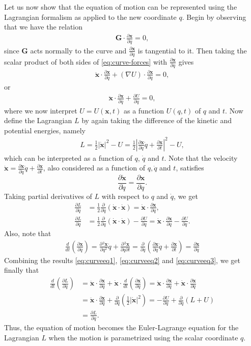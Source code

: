 \documentclass[12pt]{amsart}
\newcommand{\eq}[1]{\begin{equation}\begin{split}#1\end{split}\end{equation}}
\newcommand{\eqst}[1]{\begin{align*}#1\end{align*}}
\newcommand{\grad}{\nabla}
\newcommand{\der}[2]{\frac{d#1}{d#2}}
\newcommand{\pder}[2]{\frac{\partial#1}{\partial#2}}
\begin{document}
Let us now show that the equation of motion can be represented using the Lagrangian formalism as applied to the new coordinate $q$. Begin by observing that we have the relation
\eqst{ \mathbf{G}\cdot \pder{\mathbf{x}}{q} = 0, }
since $\mathbf{G}$ acts normally to the curve and $\pder{\mathbf{x}}{q}$ is tangential to it. Then taking the scalar product of both sides of \eqref{eq:curve-forces} with $\pder{\mathbf{x}}{q}$ gives
\eqst{ 
\ddot{\mathbf{x}} \cdot \pder{\mathbf{x}}{q} + (\grad U) \cdot \pder{\mathbf{x}}{q} = 0,
}
or 
\eq{ \label{eq:curveeq1}
\ddot{\mathbf{x}} \cdot \pder{\mathbf{x}}{q} + \pder{U}{q} = 0,
}
where we now interpret $U=U(\mathbf{x},t)$ as a function $U(q,t)$ of $q$ and $t$. Now define the Lagrangian $L$ by again taking the difference of the kinetic and potential energies, namely
\eqst{
L = \tfrac12 |\dot{\mathbf{x}}|^2 - U
= \tfrac12 \left| \pder{\mathbf{x}}{q} \dot{q} + \pder{\mathbf{x}}{t} \right|^2 - U,
}
which can be interpreted as a function of $q$, $\dot{q}$ and $t$. Note that 
the velocity $\dot{\mathbf{x}}=\pder{\mathbf{x}}{q} \dot{q} + \pder{\mathbf{x}}{t}$, also considered as a function of $q, \dot{q}$ and $t$, satisfies
$$ \pder{\dot{\mathbf{x}}}{\dot{q}} = \pder{\mathbf{x}}{q}. $$
Taking partial derivatives of $L$ with respect to $q$ and $\dot{q}$, we get
\eq{ \label{eq:curveeq2}
\pder{L}{\dot{q}} &= 
\tfrac12 \pder{}{\dot{q}} \left( \dot{\mathbf{x}}\cdot \dot{\mathbf{x}} \right)
=
\dot{\mathbf{x}} \cdot \pder{\mathbf{x}}{q}, \\
\pder{L}{q} &= 
\tfrac12 \pder{}{q} \left( \dot{\mathbf{x}}\cdot \dot{\mathbf{x}} \right) - \pder{U}{q}
=
\dot{\mathbf{x}}\cdot \pder{\dot{\mathbf{x}}}{q}-\pder{U}{q}.
}
Also, note that
\eq{ \label{eq:curveeq3}
\der{}{t}\left(\pder{\mathbf{x}}{q}\right) = \pder{\hspace{1pt}^2 \mathbf{x}}{q^2}\dot{q}
+ \pder{\hspace{1pt}^2 \mathbf{x}}{q\partial t} = \pder{}{q}
\left( \pder{\mathbf{x}}{q}\dot{q}+\pder{\mathbf{x}}{t}
\right) = \pder{\mathbf{\dot{x}}}{q}
}
Combining the results \eqref{eq:curveeq1}, \eqref{eq:curveeq2} and \eqref{eq:curveeq3}, we get finally that
\eqst{
\der{}{t}\left(\pder{L}{\dot{q}}\right)
&=
\ddot{\mathbf{x}} \cdot \pder{\mathbf{x}}{q}
+ \dot{\mathbf{x}}\cdot \der{}{t}\left( \pder{\mathbf{x}}{q}\right)
=
\ddot{\mathbf{x}} \cdot \pder{\mathbf{x}}{q}
+ \dot{\mathbf{x}} \cdot \pder{\dot{\mathbf{x}}}{q}
\\ &= 
\ddot{\mathbf{x}} \cdot \pder{\mathbf{x}}{q}
+ \pder{}{q}\left(\tfrac12|\dot{\mathbf{x}}|^2\right)
= -\pder{U}{q}+\pder{}{q}(L+U)
\\ &= \pder{L}{q}.
}
Thus, the equation of motion becomes the Euler-Lagrange equation for the Lagrangian $L$ when the motion is parametrized using the scalar coordinate $q$.
\end{document}
